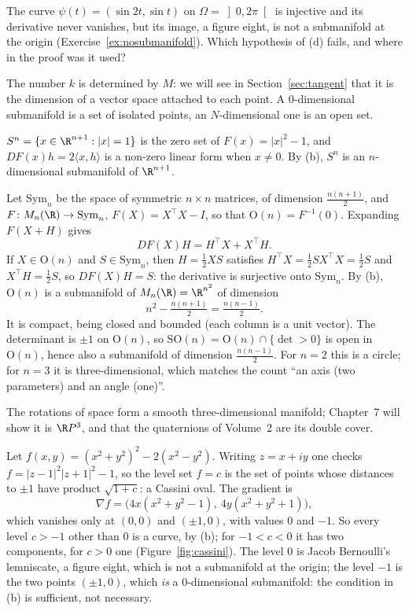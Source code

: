 \begin{think}
The curve $\psi(t)=(\sin2t,\sin t)$ on $\Omega=\left]0,2\pi\right[$ is injective and its derivative never vanishes, but its image, a figure eight, is not a
submanifold at the origin (Exercise~\ref{ex:nosubmanifold}). Which hypothesis of (d) fails, and where in the proof was it used?
\end{think}

The number $k$ is determined by $M$: we will see in Section~\ref{sec:tangent} that it is the dimension of a vector space attached to each point. A
$0$-dimensional submanifold is a set of isolated points, an $N$-dimensional one is an open set.

\begin{example}[spheres]\label{ex:spheres}
$S^n=\{x\in\R^{n+1}:|x|=1\}$ is the zero set of $F(x)=|x|^2-1$, and $DF(x)h=2\langle x,h\rangle$ is a non-zero linear form when $x\ne0$. By (b), $S^n$ is an
$n$-dimensional submanifold of $\R^{n+1}$.
\end{example}

\begin{example}\label{ex:on}
Let $\mathrm{Sym}_n$ be the space of symmetric $n\times n$ matrices, of dimension $\frac{n(n+1)}2$, and $F\colon M_n(\R)\to\mathrm{Sym}_n$,
$F(X)=X^\top X-I$, so that $\mathrm O(n)=F^{-1}(0)$. Expanding $F(X+H)$ gives
\[
DF(X)H=H^\top X+X^\top H.
\]
If $X\in\mathrm O(n)$ and $S\in\mathrm{Sym}_n$, then $H=\frac12XS$ satisfies $H^\top X=\frac12SX^\top X=\frac12S$ and $X^\top H=\frac12S$, so
$DF(X)H=S$: the derivative is surjective onto $\mathrm{Sym}_n$. By (b), $\mathrm O(n)$ is a submanifold of $M_n(\R)=\R^{n^2}$ of dimension
\[
n^2-\tfrac{n(n+1)}2=\tfrac{n(n-1)}2.
\]
It is compact, being closed and bounded (each column is a unit vector). The determinant is $\pm1$ on $\mathrm O(n)$, so $\mathrm{SO}(n)=\mathrm O(n)\cap\{\det>0\}$
is open in $\mathrm O(n)$, hence also a submanifold of dimension $\frac{n(n-1)}2$. For $n=2$ this is a circle; for $n=3$ it is three-dimensional, which
matches the count ``an axis (two parameters) and an angle (one)''.
\end{example}

The rotations of space form a smooth three-dimensional manifold; Chapter~7 will show it is $\R P^3$, and that the quaternions of Volume~2 are its double
cover.

\begin{example}\label{ex:cassini}
Let $f(x,y)=(x^2+y^2)^2-2(x^2-y^2)$. Writing $z=x+iy$ one checks $f=|z-1|^2|z+1|^2-1$, so the level set $f=c$ is the set of points whose distances to
$\pm1$ have product $\sqrt{1+c}$: a Cassini oval. The gradient is
\[
\nabla f=\bigl(4x(x^2+y^2-1),\ 4y(x^2+y^2+1)\bigr),
\]
which vanishes only at $(0,0)$ and $(\pm1,0)$, with values $0$ and $-1$. So every level $c>-1$ other than $0$ is a curve, by (b); for
$-1<c<0$ it has two components, for $c>0$ one (Figure~\ref{fig:cassini}). The level $0$ is Jacob Bernoulli's lemniscate, a figure eight, which is not a
submanifold at the origin; the level $-1$ is the two points $(\pm1,0)$, which \emph{is} a $0$-dimensional submanifold: the condition in (b) is
sufficient, not necessary.
\end{example}

